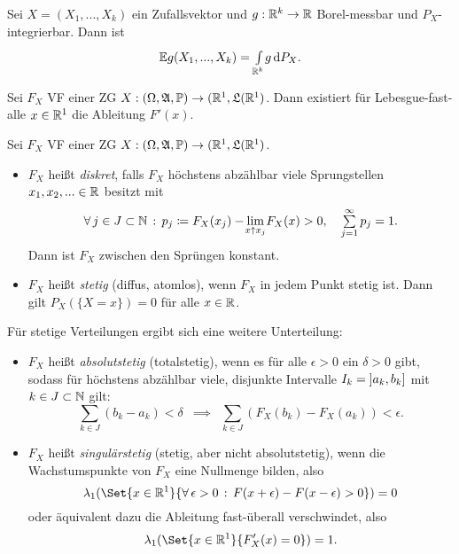 \documentclass{cheat-sheet}
\newcommand{\Alg}{\mathfrak{A}} %
\newcommand{\LebAlg}{\mathfrak{L}} %
\renewcommand{\P}{\mathbb{P}} %
\newcommand{\E}{\mathbb{E}} %
\begin{document}
\begin{bem}
  Sei $X = (X_1, ..., X_k)$ ein Zufallsvektor und $g : \mathbb{R}^k \to \mathbb{R}$ Borel-messbar und $P_X$-integrierbar. Dann ist
  \[ \E g(X_1, ..., X_k) = \Int{\R^k}{}{g}{P_{X}}. \]
\end{bem}



\begin{satz}
  Sei $F_X$ VF einer ZG $X : (\Omega, \Alg, \P) \to (\R^1, \LebAlg(\R^1)$. Dann existiert für Lebesgue-fast-alle $x \in \mathbb{R}^1$ die Ableitung $F'(x)$.
\end{satz}

\begin{defn}
  Sei $F_X$ VF einer ZG $X : (\Omega, \Alg, \P) \to (\R^1, \LebAlg(\R^1)$.
  \begin{itemize}
    \item $F_X$ heißt \emph{diskret}, falls $F_X$ höchstens abzählbar viele Sprungstellen $x_1, x_2, ... \in \mathbb{R}$ besitzt mit
      \[ \fa{j \in J \subset \N} p_j \coloneqq F_X(x_j) - \lim_{\mathclap{x \uparrow x_j}} F_X(x) > 0, \quad \sum_{j=1}^\infty p_j = 1. \]
    Dann ist $F_X$ zwischen den Sprüngen konstant.
    \item $F_X$ heißt \emph{stetig} (diffus, atomlos), wenn $F_X$ in jedem Punkt stetig ist. Dann gilt $P_X(\{ X = x \}) = 0$ für alle $x \in \mathbb{R}$.
  \end{itemize}
  Für stetige Verteilungen ergibt sich eine weitere Unterteilung:
  \begin{itemize}
    \item $F_X$ heißt \emph{absolutstetig} (totalstetig), wenn es für alle $\epsilon > 0$ ein $\delta > 0$ gibt, sodass für höchstens abzählbar viele, disjunkte Intervalle $I_k = \left] a_k, b_k \right]$ mit $k \in J \subset \mathbb{N}$ gilt:
    \[ \sum_{k \in J} (b_k - a_k) < \delta \enspace \implies \enspace \sum_{k \in J} (F_X(b_k) - F_X(a_k)) < \epsilon. \]
    \item $F_X$ heißt \emph{singulärstetig} (stetig, aber nicht absolutstetig), wenn die Wachstumspunkte von $F_X$ eine Nullmenge bilden, also
    \[ \lambda_1(\Set{ x \in \R^1 }{ \fa{\epsilon > 0} F(x+\epsilon)- F(x-\epsilon) > 0 }) = 0 \]
    oder äquivalent dazu die Ableitung fast-überall verschwindet, also
    \[ \lambda_1(\Set{ x \in \R^1 }{ F_X'(x) = 0 }) = 1. \]
  \end{itemize}
\end{defn}
\end{document}
